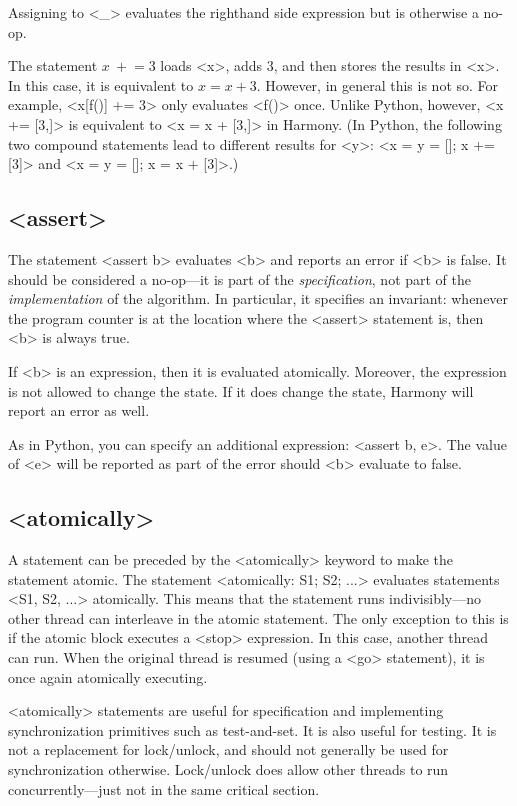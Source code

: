 \documentclass{report}
\begin{document}
Assigning to <{_}> evaluates the righthand side expression but is otherwise
a no-op.

The statement $x~+$$= 3$ loads <{x}>, adds 3, and then stores the
results in <{x}>.  In this case, it is equivalent to $x = x + 3$.
However, in general this is not so.  For example, <{x[f()] += 3}>
only evaluates <{f()}> once.  Unlike Python, however,
<{x += [3,]}> is equivalent to <{x = x + [3,]}> in Harmony.
(In Python, the following two compound statements lead to different results
for <{y}>: <{x = y = []; x += [3]}> and <{x = y = []; x = x + [3]}>.)

\subsection*{<{assert}>}

The statement <{assert b}> evaluates <{b}> and reports an error
if <{b}> is false.  It should be considered a no-op---it is part of the
\emph{specification}, not part of the \emph{implementation} of the algorithm.
In particular, it specifies an invariant: whenever the program counter is
at the location where the <{assert}> statement is, then <{b}> is
always true.

If <{b}> is an expression, then it is evaluated atomically.
Moreover, the expression is not allowed to change the state.
If it does change the state, Harmony will report an error as well.

As in Python, you can specify an additional expression:
<{assert b, e}>.  The value of <{e}> will be reported as part
of the error should <{b}> evaluate to false.

\subsection*{<{atomically}>}

A statement can be preceded by the <{atomically}> keyword to
make the statement atomic.
The statement <{atomically: S1; S2; ...}> evaluates statements
<{S1, S2, ...}> atomically.
This means that the statement runs indivisibly---no other thread can
interleave in the atomic statement.  The only exception
to this is if the atomic block executes a <{stop}> expression.
In this case, another thread can run.  When the original thread
is resumed (using a <{go}> statement), it is once again
atomically executing.

<{atomically}> statements are useful for specification and
implementing synchronization primitives such as test-and-set.
It is also useful for testing.
It is not a replacement for lock/unlock, and should not generally be used
for synchronization otherwise.  Lock/unlock does allow other
threads to run concurrently---just not in the same critical section.
\end{document}
